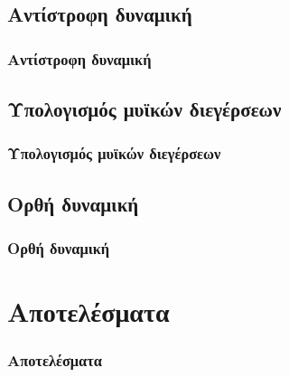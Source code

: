 \documentclass[8pt,sans,mathserif,aspectratio=43]{beamer}%
\begin{document}
\subsection{Αντίστροφη δυναμική}
\begin{frame}
\frametitle{Αντίστροφη δυναμική}

\end{frame}

\subsection{Υπολογισμός μυϊκών διεγέρσεων}
\begin{frame}
\frametitle{Υπολογισμός μυϊκών διεγέρσεων}

\end{frame}

\subsection{Ορθή δυναμική}
\begin{frame}
\frametitle{Ορθή δυναμική}

\end{frame}

\section{Αποτελέσματα}
\begin{frame}
\frametitle{Αποτελέσματα}

\end{frame}
\end{document}
